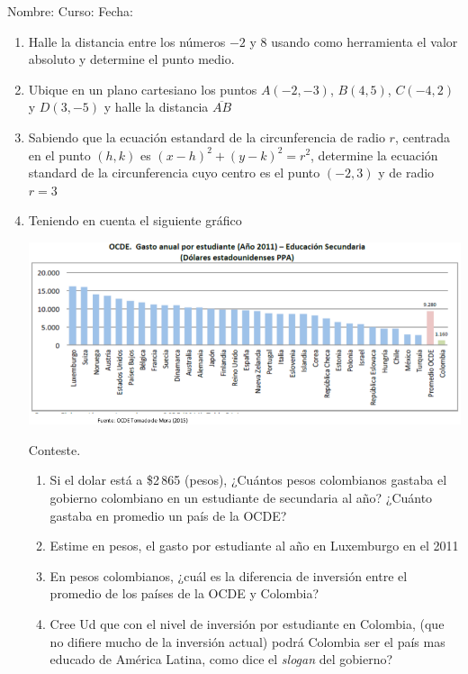 \documentclass[fleqn]{article}
\newcommand{\LineaNombre}{%
\par
\vspace{\baselineskip}
Nombre:\hrulefill \; Curso: \underline{\hspace*{48pt}} \; Fecha: \underline{\hspace*{2.5cm}} \relax
\par}
\begin{document}
\LineaNombre
\begin{enumerate}
 \item Halle la distancia entre los números $-2$ y 8 usando como herramienta el valor absoluto y determine el punto medio.\noanswer
 \item Ubique en un plano cartesiano los puntos $A(-2,-3)$, $B(4,5)$, $C(-4,2)$ y $D(3,-5)$ y halle la distancia $\overline{AB}$
  \item Sabiendo que la ecuación estandard de la circunferencia de radio $r$, centrada en el punto $(h,k)$ es $(x-h)^{2}+(y-k)^{2}=r^{2}$, determine la ecuación standard de la circunferencia cuyo centro es el punto $(-2,3)$ y de radio $r=3$ \noanswer
 \item Teniendo en cuenta el siguiente gráfico
 \begin{center}
 \includegraphics[scale=.45]{Images/GastoEstudEducSec.png} 
 \end{center}
 Conteste.
 \begin{enumerate}
 \item Si el dolar está a \$2\,865 (pesos), ¿Cuántos pesos colombianos gastaba el gobierno colombiano en un estudiante de secundaria al año? ¿Cuánto gastaba en promedio un país de la OCDE?
 \newpage
 \item Estime en pesos, el gasto por estudiante al año en Luxemburgo en el 2011 \noanswer
 \item En pesos colombianos, ¿cuál es la diferencia de inversión entre el promedio de los países de la OCDE y Colombia?\noanswer
 \item Cree Ud que con el nivel de inversión por estudiante en Colombia, (que no difiere mucho de la inversión actual) podrá Colombia ser el país mas educado de América Latina, como dice el \emph{slogan} del gobierno?\noanswer

\end{enumerate}
\end{enumerate}
\end{document}
